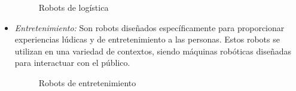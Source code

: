 \begin{itemize}
 \begin{figure}[H]
    \begin{center}
      \subcapcentertrue
      \hspace{2mm}
    \end{center}
    \caption{Robots de logística}
    \label{fig:Robots de logística}
  \end{figure}
  
 \item \textit{Entretenimiento:} Son robots diseñados específicamente para proporcionar experiencias lúdicas y de entretenimiento a las personas. Estos robots se utilizan en una variedad de contextos, siendo máquinas robóticas diseñadas para interactuar con el público. 
 
  \begin{figure}[H]
    \begin{center}
      \subcapcentertrue
      \hspace{2mm}
    \end{center}
    \caption{Robots de entretenimiento}
    \label{fig:Robots_entretenimiento}
  \end{figure}
   
\end{itemize}

